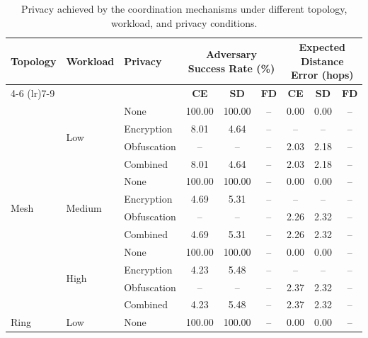 \begin{table}[!t]
\centering
\caption{Privacy achieved by the coordination mechanisms under different topology, workload, and privacy conditions.}
\label{tab:privacy_effectiveness}
\setlength{\tabcolsep}{6pt}
\begin{tabular}{lllccc ccc}
\toprule
\multirow{2}{*}{\textbf{Topology}} & \multirow{2}{*}{\textbf{Workload}} & \multirow{2}{*}{\textbf{Privacy}}
& \multicolumn{3}{c}{\textbf{Adversary Success Rate (\%)}} & \multicolumn{3}{c}{\textbf{Expected Distance Error (hops)}} \\
\cmidrule(lr){4-6}
\cmidrule(lr){7-9}
& & & \textbf{CE} & \textbf{SD} & \textbf{FD} & \textbf{CE} & \textbf{SD} & \textbf{FD} \\
\midrule
\multirow{12}{*}{Mesh} & \multirow{4}{*}{Low} & None & \cellcolor[gray]{0.70}100.00 & \cellcolor[gray]{0.70}100.00 & -- & \cellcolor[gray]{0.70}0.00 & \cellcolor[gray]{0.70}0.00 & -- \\
 &  & Encryption & 8.01 & \cellcolor[gray]{0.70}4.64 & -- & -- & -- & -- \\
 &  & Obfuscation & -- & -- & -- & 2.03 & \cellcolor[gray]{0.70}2.18 & -- \\
 &  & Combined & 8.01 & \cellcolor[gray]{0.70}4.64 & -- & 2.03 & \cellcolor[gray]{0.70}2.18 & -- \\
\cmidrule(lr){2-9}
 & \multirow{4}{*}{Medium} & None & \cellcolor[gray]{0.70}100.00 & \cellcolor[gray]{0.70}100.00 & -- & \cellcolor[gray]{0.70}0.00 & \cellcolor[gray]{0.70}0.00 & -- \\
 &  & Encryption & \cellcolor[gray]{0.70}4.69 & 5.31 & -- & -- & -- & -- \\
 &  & Obfuscation & -- & -- & -- & 2.26 & \cellcolor[gray]{0.70}2.32 & -- \\
 &  & Combined & \cellcolor[gray]{0.70}4.69 & 5.31 & -- & 2.26 & \cellcolor[gray]{0.70}2.32 & -- \\
\cmidrule(lr){2-9}
 & \multirow{4}{*}{High} & None & \cellcolor[gray]{0.70}100.00 & \cellcolor[gray]{0.70}100.00 & -- & \cellcolor[gray]{0.70}0.00 & \cellcolor[gray]{0.70}0.00 & -- \\
 &  & Encryption & \cellcolor[gray]{0.70}4.23 & 5.48 & -- & -- & -- & -- \\
 &  & Obfuscation & -- & -- & -- & \cellcolor[gray]{0.70}2.37 & 2.32 & -- \\
 &  & Combined & \cellcolor[gray]{0.70}4.23 & 5.48 & -- & \cellcolor[gray]{0.70}2.37 & 2.32 & -- \\
\midrule
\multirow{12}{*}{Ring} & \multirow{4}{*}{Low} & None & \cellcolor[gray]{0.70}100.00 & \cellcolor[gray]{0.70}100.00 & -- & \cellcolor[gray]{0.70}0.00 & \cellcolor[gray]{0.70}0.00 & -- \\

\end{tabular}
\end{table}
